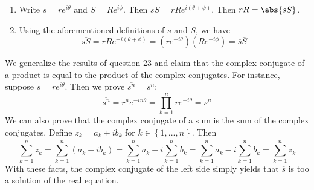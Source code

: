 \documentclass[a4paper]{article}
\begin{document}

\begin{enumerate}[label=(\alph*)]
	\item Write \(s = re^{i \theta }\) and \(S = Re^{i \phi }\). Then \(sS = rR e^{i \!\left( \theta + \phi  \right) }\). Then \(rR = \abs{sS}\).
	\item Using the aforementioned definitions of \(s\) and \(S\), we have 
	\[
		\overline{sS} = rRe^{-i \!\left( \theta + \phi  \right)} = \!\left( re^{-i \theta } \right) \!\left( Re^{-i \phi } \right) = \overline{s}\overline{S}
	\]
\end{enumerate}

\newpage

We generalize the results of question 23 and claim that the complex conjugate of a product is equal to the product of the complex conjugates. For instance, suppose \(s = re^{i \theta }\). Then we prove \(\overline{s^{n}} = \overline{s}^{n}\):
\[
	\overline{s^{n}} = r^{n}e^{-in \theta } = \prod_{k=1}^{n} re^{-i \theta } = \overline{s}^{n}
\]
We can also prove that the complex conjugate of a sum is the sum of the complex conjugates. Define \(z_{k} = a_{k} + i b_{k}\) for \(k \in \!\left\{ 1, ..., n \right\} \). Then
\[
	\overline{\sum_{k=1}^{n} z_{k}} = \overline{\sum_{k=1}^{n} \!\left( a_{k} + ib_{k} \right)} = \overline{\sum_{k=1}^{n} a_{k} + i \sum_{k=1}^{n} b_{k}} = \sum_{k=1}^{n} a_{k} - i \sum_{k=1}^{n} b_{k} = \sum_{k=1}^{n} \overline{z_{k}}
\]
With these facts, the complex conjugate of the left side simply yields that \(\overline{s}\) is too a solution of the real equation.

\vspace{12pt}
\end{document}

